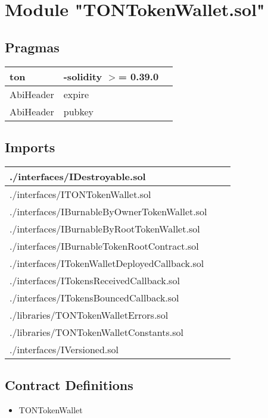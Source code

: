 
\section{Module "TONTokenWallet.sol"}


\subsection{Pragmas}


\noindent\begin{tabular}{|l|l|p{5cm}|}\hline
ton & -solidity $>$= 0.39.0 &\\\hline
AbiHeader &  expire &\\\hline
AbiHeader &  pubkey &\\\hline
\end{tabular}


\subsection{Imports}


\noindent\begin{tabular}{|l|l|p{5cm}|}\hline
./interfaces/IDestroyable.sol &\\\hline
./interfaces/ITONTokenWallet.sol &\\\hline
./interfaces/IBurnableByOwnerTokenWallet.sol &\\\hline
./interfaces/IBurnableByRootTokenWallet.sol &\\\hline
./interfaces/IBurnableTokenRootContract.sol &\\\hline
./interfaces/ITokenWalletDeployedCallback.sol &\\\hline
./interfaces/ITokensReceivedCallback.sol &\\\hline
./interfaces/ITokensBouncedCallback.sol &\\\hline
./libraries/TONTokenWalletErrors.sol &\\\hline
./libraries/TONTokenWalletConstants.sol &\\\hline
./interfaces/IVersioned.sol &\\\hline
\end{tabular}


\subsection{Contract Definitions}

\begin{itemize}
\item TONTokenWallet
\end{itemize}
